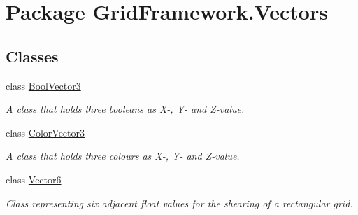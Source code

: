 \hypertarget{namespace_grid_framework_1_1_vectors}{\section{Package Grid\+Framework.\+Vectors}
\label{namespace_grid_framework_1_1_vectors}
}
\subsection*{Classes}
\begin{DoxyCompactItemize}
\item 
class \hyperlink{class_grid_framework_1_1_vectors_1_1_bool_vector3}{Bool\+Vector3}
\begin{DoxyCompactList}\small\item\em A class that holds three booleans as X-\/, Y-\/ and Z-\/value.\end{DoxyCompactList}\item 
class \hyperlink{class_grid_framework_1_1_vectors_1_1_color_vector3}{Color\+Vector3}
\begin{DoxyCompactList}\small\item\em A class that holds three colours as X-\/, Y-\/ and Z-\/value.\end{DoxyCompactList}\item 
class \hyperlink{class_grid_framework_1_1_vectors_1_1_vector6}{Vector6}
\begin{DoxyCompactList}\small\item\em Class representing six adjacent float values for the shearing of a rectangular grid.\end{DoxyCompactList}\end{DoxyCompactItemize}
